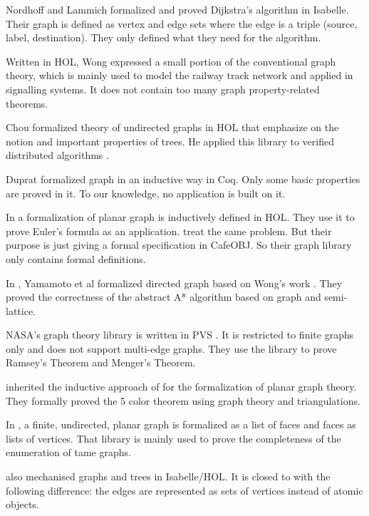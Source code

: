 Nordhoff and Lammich \cite{Dijkstra_Shortest_Path-AFP} formalized and
proved Dijkstra's algorithm in Isabelle. Their graph is defined as
vertex and edge sets where the edge is a triple (source, label,
destination). They only defined what they need for the algorithm.

Written in HOL, Wong \cite{wong1991} expressed a small portion of the
conventional graph theory, which is mainly used to model the railway
track network and applied in signalling systems. It does not contain
too many graph property-related theorems.

Chou \cite{chou1994formal} formalized theory of undirected graphs in
HOL that emphasize on the notion and important properties of trees. He
applied this library to verified distributed algorithms
\cite{chou1995mechanical}.

Duprat \cite{duprat2001coq} formalized graph in an inductive way in
Coq. Only some basic properties are proved in it. To our knowledge, no
application is built on it.

In \cite{yamamoto1995formalization} a formalization of planar graph is
inductively defined in HOL. They use it to prove Euler's formula as an
application. \cite{tamai2000formal} treat the same problem. But their
purpose is just giving a formal specification in CafeOBJ. So their
graph library only contains formal definitions.

In \cite{yamamoto1998formalization}, Yamamoto et al formalized
directed graph based on Wong's work \cite{wong1991}. They proved the
correctness of the abstract A* algorithm based on graph and
semi-lattice. \cite{tamai2000formal}

NASA's graph theory library is written in PVS
\cite{R.W.:1998:PGT:886490}. It is restricted to finite graphs only
and does not support multi-edge graphs. They use the library to prove
Ramsey's Theorem and Menger's Theorem.

\cite{bauer20025} inherited the inductive approach of
\cite{yamamoto1995formalization} for the formalization of planar graph
theory. They formally proved the 5 color theorem using graph theory
and triangulations.

In \cite{nipkow2006flyspeck}, a finite, undirected, planar graph is
formalized as a list of faces and faces as lists of vertices. That
library is mainly used to prove the completeness of the enumeration of
tame graphs.

\cite{ridge2005graphs} also mechanised graphs and trees in
Isabelle/HOL. It is closed to \cite{wong1991} with the following
difference: the edges are represented as sets of vertices instead of
atomic objects.

